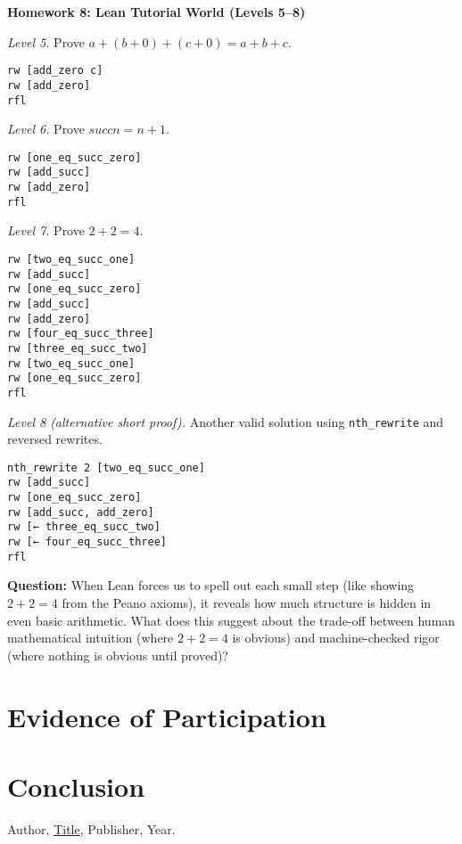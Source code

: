 \documentclass{article}
\theoremstyle{plain}
\theoremstyle{definition}
\theoremstyle{remark}
\begin{document}
\textbf{Homework 8: Lean Tutorial World (Levels 5--8)}

\textit{Level 5.} Prove $a + (b + 0) + (c + 0) = a + b + c$.

\begin{verbatim}
rw [add_zero c]
rw [add_zero]
rfl
\end{verbatim}

\textit{Level 6.} Prove $succ n = n + 1$.

\begin{verbatim}
rw [one_eq_succ_zero]
rw [add_succ]
rw [add_zero]
rfl
\end{verbatim}

\textit{Level 7.} Prove $2 + 2 = 4$.

\begin{verbatim}
rw [two_eq_succ_one]
rw [add_succ]
rw [one_eq_succ_zero]
rw [add_succ]
rw [add_zero]
rw [four_eq_succ_three]
rw [three_eq_succ_two]
rw [two_eq_succ_one]
rw [one_eq_succ_zero]
rfl
\end{verbatim}

\textit{Level 8 (alternative short proof).} Another valid solution using \texttt{nth\_rewrite} and reversed rewrites.

\begin{verbatim}
nth_rewrite 2 [two_eq_succ_one]
rw [add_succ]
rw [one_eq_succ_zero]
rw [add_succ, add_zero]
rw [← three_eq_succ_two]
rw [← four_eq_succ_three]
rfl
\end{verbatim}

\textbf{Question:} When Lean forces us to spell out each small step (like showing $2 + 2 = 4$ from the Peano axioms), it reveals how much structure is hidden in even basic arithmetic. What does this suggest about the trade-off between human mathematical intuition (where $2 + 2 = 4$ is obvious) and machine-checked rigor (where nothing is obvious until proved)?




\section{Evidence of Participation}

\section{Conclusion}\label{conclusion}

\begin{thebibliography}{99}
 Author, \href{https://en.wikipedia.org/wiki/LaTeX}{Title}, Publisher, Year.
\end{thebibliography}
\end{document}
